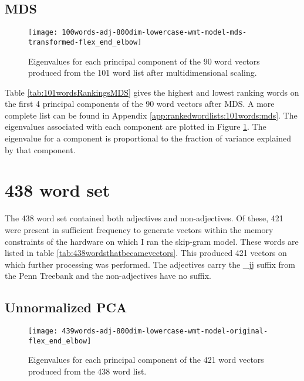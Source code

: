 \documentclass[eric_thesis.tex]{subfiles}
\begin{document}
\subsection{MDS}



\begin{figure}[!tbp]
    \texttt{[image: 100words-adj-800dim-lowercase-wmt-model-mds-transformed-flex\_end\_elbow]}
    \caption{Eigenvalues for each principal component of the 90 word vectors
    produced from the 101 word list after multidimensional scaling.}
    \label{fig:101wordsmdseigenvalues}
\end{figure}

Table \ref{tab:101wordsRankingsMDS} gives the highest and lowest
ranking words on the first 4 principal components of the 90 word 
vectors after MDS. A more complete list can be found in Appendix 
\ref{app:rankedwordlists:101words:mds}. The eigenvalues associated 
with each component are plotted in Figure 
\ref{fig:101wordsmdseigenvalues}. The eigenvalue for a component is
proportional to the fraction of variance explained by that component.


\section{438 word set}

The 438 word set contained both adjectives and non-adjectives. Of these, 421 
were present in sufficient frequency to generate vectors within the memory 
constraints of the hardware on which I ran the skip-gram model. These words are 
listed in table \ref{tab:438wordsthatbecamevectors}. This produced 421 vectors 
on which further processing was performed. The adjectives carry the \_jj suffix 
from the Penn Treebank  and the non-adjectives have 
no suffix.




\subsection{Unnormalized PCA}



\begin{figure}[!tbp]
    \texttt{[image: 439words-adj-800dim-lowercase-wmt-model-original-flex\_end\_elbow]}
    \caption{Eigenvalues for each principal component of the 421 word vectors
    produced from the 438 word list.}
    \label{fig:438wordsunnormalizedpcaeigenvalues}
\end{figure}
\end{document}
